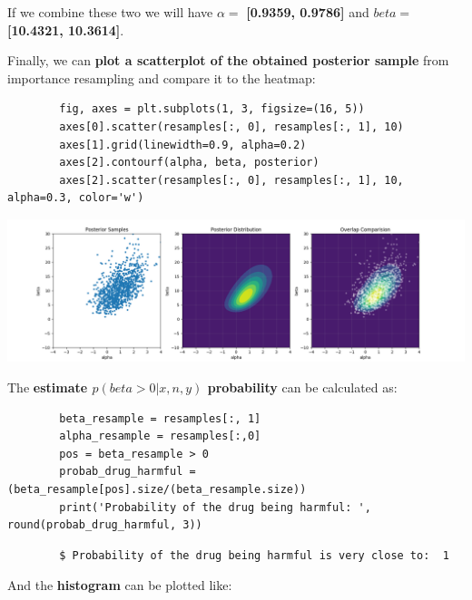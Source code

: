\documentclass[11pt,a4paper,english]{article}
\begin{document}
      If we combine these two we will have $\alpha =$ \textbf{[0.9359, 0.9786]} and
      $beta =$ \textbf{[10.4321, 10.3614]}.

      Finally, we can \textbf{plot a scatterplot of the obtained posterior sample} from importance resampling
      and compare it to the heatmap:

      \begin{verbatim}
        fig, axes = plt.subplots(1, 3, figsize=(16, 5))
        axes[0].scatter(resamples[:, 0], resamples[:, 1], 10)
        axes[1].grid(linewidth=0.9, alpha=0.2)
        axes[2].contourf(alpha, beta, posterior)
        axes[2].scatter(resamples[:, 0], resamples[:, 1], 10, alpha=0.3, color='w')
      \end{verbatim}

      \includegraphics[width=17.7cm]{4_posterior_comparision.png}

      The \textbf{estimate $p(beta > 0 | x, n, y)$ probability} can be calculated as:
      \begin{verbatim}
        beta_resample = resamples[:, 1]
        alpha_resample = resamples[:,0]
        pos = beta_resample > 0
        probab_drug_harmful = (beta_resample[pos].size/(beta_resample.size))
        print('Probability of the drug being harmful: ', round(probab_drug_harmful, 3))
      \end{verbatim}

      \begin{verbatim}
        $ Probability of the drug being harmful is very close to:  1
      \end{verbatim}

      And the \textbf{histogram} can be plotted like:
\end{document}
